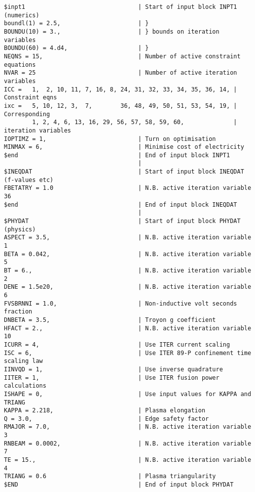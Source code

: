 \documentclass[11pt,a4paper]{report}
\begin{document}
\footnotesize
\begin{verbatim}
$inpt1                                | Start of input block INPT1 (numerics)
boundl(1) = 2.5,                      | }
BOUNDU(10) = 3.,                      | } bounds on iteration variables
BOUNDU(60) = 4.d4,                    | }
NEQNS = 15,                           | Number of active constraint equations
NVAR = 25                             | Number of active iteration variables
ICC =   1,  2, 10, 11, 7, 16, 8, 24, 31, 32, 33, 34, 35, 36, 14, | Constraint eqns
ixc =   5, 10, 12, 3,  7,        36, 48, 49, 50, 51, 53, 54, 19, | Corresponding
        1, 2, 4, 6, 13, 16, 29, 56, 57, 58, 59, 60,              | iteration variables
IOPTIMZ = 1,                          | Turn on optimisation 
MINMAX = 6,                           | Minimise cost of electricity
$end                                  | End of input block INPT1
                                      | 
$INEQDAT                              | Start of input block INEQDAT (f-values etc)
FBETATRY = 1.0                        | N.B. active iteration variable 36
$end                                  | End of input block INEQDAT
                                      | 
$PHYDAT                               | Start of input block PHYDAT (physics)
ASPECT = 3.5,                         | N.B. active iteration variable 1
BETA = 0.042,                         | N.B. active iteration variable 5
BT = 6.,                              | N.B. active iteration variable 2
DENE = 1.5e20,                        | N.B. active iteration variable 6
FVSBRNNI = 1.0,                       | Non-inductive volt seconds fraction
DNBETA = 3.5,                         | Troyon g coefficient
HFACT = 2.,                           | N.B. active iteration variable 10
ICURR = 4,                            | Use ITER current scaling
ISC = 6,                              | Use ITER 89-P confinement time scaling law
IINVQD = 1,                           | Use inverse quadrature
IITER = 1,                            | Use ITER fusion power calculations
ISHAPE = 0,                           | Use input values for KAPPA and TRIANG
KAPPA = 2.218,                        | Plasma elongation
Q = 3.0,                              | Edge safety factor
RMAJOR = 7.0,                         | N.B. active iteration variable 3
RNBEAM = 0.0002,                      | N.B. active iteration variable 7
TE = 15.,                             | N.B. active iteration variable 4
TRIANG = 0.6                          | Plasma triangularity
$END                                  | End of input block PHYDAT

\end{verbatim}
\end{document}

